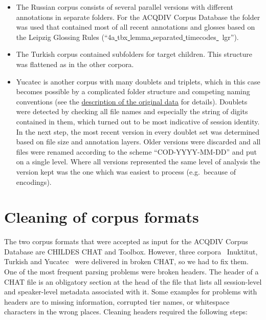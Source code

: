 \documentclass[a4paper, 11pt]{book}
\newcommand{\und}{\underline{{ }}\hspace{0.2mm}}	%
\begin{document}
\begin{itemize}
	\item The Russian corpus consists of several parallel versions with different annotations in separate folders. For the ACQDIV Corpus Database the folder was used that contained most of all recent annotations and glosses based on the Leipzig Glossing Rules (“4a\und tbx\und lemma\und separated\und timecodes\und\ lgr”). 
	\item The Turkish corpus contained subfolders for target children. This structure was flattened as in the other corpora. 
	\item Yucatec is another corpus with many doublets and triplets, which in this case becomes possible by a complicated folder structure and competing naming conventions (see the \hyperref[subsec: Yucatec file system and formats]{description of the original data} for details). Doublets were detected by checking all file names and especially the string of digits contained in them, which turned out to be most indicative of session identity. In the next step, the most recent version in every doublet set was determined based on file size and annotation layers. Older versions were discarded and all files were renamed according to the scheme “COD-YYYY-MM-DD” and put on a single level. Where all versions represented the same level of analysis the version kept was the one which was easiest to process (e.g.\ because of encodings). 
\end{itemize}


\section{Cleaning of corpus formats}
\label{sec:Cleaning of corpus formats}


The two corpus formats that were accepted as input for the ACQDIV Corpus Database are CHILDES CHAT and Toolbox. However, three corpora \textendash\ Inuktitut, Turkish and Yucatec \textendash\ were delivered in broken CHAT, so we had to fix them. One of the most frequent parsing problems were broken headers. The header of a CHAT file is an obligatory section at the head of the file that lists all session-level and speaker-level metadata associated with it. Some examples for problems with headers are to missing information, corrupted tier names, or whitespace characters in the wrong places. Cleaning headers required the following steps: 
\end{document}
